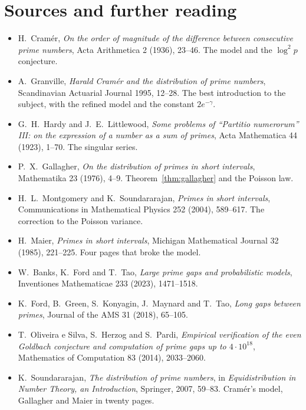 \section*{Sources and further reading}

\begin{itemize}
\item H.~Cramér, \emph{On the order of magnitude of the difference between consecutive prime numbers}, Acta Arithmetica 2 (1936), 23--46. The model and the $\log^2p$ conjecture.
\item A.~Granville, \emph{Harald Cramér and the distribution of prime numbers}, Scandinavian Actuarial Journal 1995, 12--28. The best introduction to the subject, with the refined model and the constant $2e^{-\gamma}$.
\item G.~H.~Hardy and J.~E.~Littlewood, \emph{Some problems of ``Partitio numerorum'' III: on the expression of a number as a sum of primes}, Acta Mathematica 44 (1923), 1--70. The singular series.
\item P.~X.~Gallagher, \emph{On the distribution of primes in short intervals}, Mathematika 23 (1976), 4--9. Theorem~\ref{thm:gallagher} and the Poisson law.
\item H.~L.~Montgomery and K.~Soundararajan, \emph{Primes in short intervals}, Communications in Mathematical Physics 252 (2004), 589--617. The correction to the Poisson variance.
\item H.~Maier, \emph{Primes in short intervals}, Michigan Mathematical Journal 32 (1985), 221--225. Four pages that broke the model.
\item W.~Banks, K.~Ford and T.~Tao, \emph{Large prime gaps and probabilistic models}, Inventiones Mathematicae 233 (2023), 1471--1518.
\item K.~Ford, B.~Green, S.~Konyagin, J.~Maynard and T.~Tao, \emph{Long gaps between primes}, Journal of the AMS 31 (2018), 65--105.
\item T.~Oliveira e Silva, S.~Herzog and S.~Pardi, \emph{Empirical verification of the even Goldbach conjecture and computation of prime gaps up to $4\cdot10^{18}$}, Mathematics of Computation 83 (2014), 2033--2060.
\item K.~Soundararajan, \emph{The distribution of prime numbers}, in \emph{Equidistribution in Number Theory, an Introduction}, Springer, 2007, 59--83. Cramér's model, Gallagher and Maier in twenty pages.
\end{itemize}
